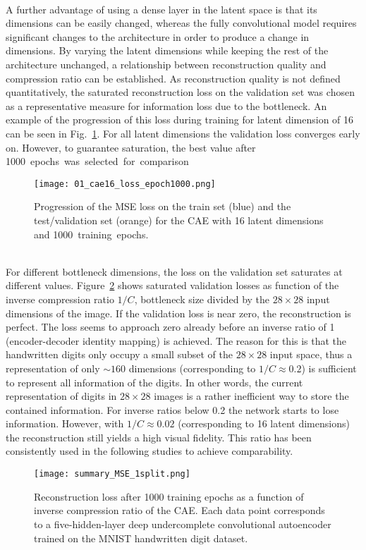 \documentclass[../../main.tex]{subfiles}
\begin{document}
\\
A further advantage of using a dense layer in the latent space is that its dimensions can be easily changed, whereas the fully convolutional model requires significant changes to the architecture in order to produce a change in dimensions. By varying the latent dimensions while keeping the rest of the architecture unchanged, a relationship between reconstruction quality and compression ratio can be established. As reconstruction quality is not defined quantitatively, the saturated reconstruction loss on the validation set  was chosen as a representative measure for information loss due to the bottleneck. An example of the progression of this loss during training for latent dimension of 16 can be seen in Fig.~\ref{fig:cae16_train}. For all latent dimensions the validation loss converges early on. However, to guarantee saturation, the best value after \SI{1000} epochs was selected for comparison.\\
\begin{figure}[htp]
			\begin{center}
				\texttt{[image: 01\_cae16\_loss\_epoch1000.png]}
				\caption{Progression of the MSE loss on the train set (blue) and the test/validation set (orange) for the CAE with 16 latent dimensions and \SI{1000} training epochs.}
				\label{fig:cae16_train}
			\end{center}
\end{figure}
\\
For different bottleneck dimensions, the loss on the validation set saturates at different values. Figure~\ref{fig:latent_dim} shows saturated validation losses as function of the inverse compression ratio $1/C$, bottleneck size divided by the $28\times28$ input dimensions of the image. If the validation loss is near zero, the reconstruction is perfect. The loss seems to approach zero already before an inverse ratio of 1 (encoder-decoder identity mapping) is achieved. The reason for this is that the handwritten digits only occupy a small subset of the $28\times28$ input space, thus a representation of only $\sim160$ dimensions (corresponding to $1/C\approx0.2$) is sufficient to represent all information of the digits. In other words, the current representation of digits in $28\times28$ images is a rather inefficient way to store the contained information. For inverse ratios below 0.2 the network starts to lose information. However, with $1/C\approx0.02$ (corresponding to 16 latent dimensions) the reconstruction still yields a high visual fidelity. This ratio has been consistently used in the following studies to achieve comparability.\\
\begin{figure}[htp]
			\begin{center}
				\texttt{[image: summary\_MSE\_1split.png]}
				\caption{Reconstruction loss after 1000 training epochs as a function of inverse compression ratio of the CAE. Each data point corresponds to a five-hidden-layer deep undercomplete convolutional autoencoder trained on the MNIST handwritten digit dataset.}
				\label{fig:latent_dim}
			\end{center}
\end{figure}
\\
\end{document}
